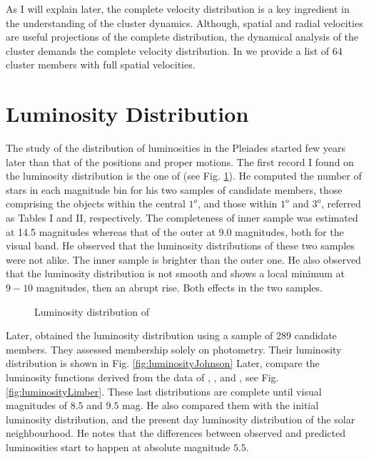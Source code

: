 As I will explain later, the complete velocity distribution is a key ingredient in the understanding of the cluster dynamics. Although, spatial and radial velocities are useful projections of the complete distribution, the dynamical analysis of the cluster demands the complete velocity distribution. In \citet{Galli2017} we provide a list of 64 cluster members with full spatial velocities. 
\section{Luminosity Distribution}

The study of the distribution of luminosities in the Pleiades started few years later than that of the positions and proper motions. The first record I found on the luminosity distribution is the one of \citet{Trumpler1921} (see Fig. \ref{fig:luminosityTrumpler}). He computed the number of stars in each magnitude bin for his two samples of candidate members, those comprising the objects within the central $1^o$, and those within $1^o$ and $3^o$, referred as Tables I and II, respectively. The completeness of inner sample was estimated at 14.5 magnitudes whereas that of the outer at  9.0 magnitudes, both for the visual band. He observed that the luminosity distributions of these two samples were not alike. The inner sample is brighter than the outer one. He also observed that the luminosity distribution is not smooth and shows a local minimum at $9-10$ magnitudes, then an abrupt rise. Both effects in the two samples.

\begin{figure}[htbp]
\begin{center}
\caption{Luminosity distribution of \citet{Trumpler1921}}
\label{fig:luminosityTrumpler}
\end{center}
\end{figure}

Later, \citet{Johnson1958} obtained the luminosity distribution using a sample of 289 candidate members. They assessed  membership solely on photometry. Their luminosity distribution is shown in Fig. \ref{fig:luminosityJohnson}
Later, \citet{Limber1962} compare the luminosity functions derived from the data of \citet{Trumpler1921}, \citet{Hertzsprung1947}, and \citet{Johnson1958}, see Fig. \ref{fig:luminosityLimber}. These last distributions are complete until visual magnitudes of $8.5$ and $9.5$ mag. He also compared them with the initial luminosity distribution, and the present day luminosity distribution of the solar neighbourhood. He notes that the differences between observed and predicted luminosities start to happen at absolute magnitude $5.5$.

